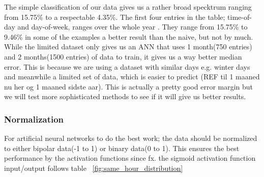 \begin{table}[!ht]
\centering  %
\caption{Results from the simple classification approach} %
\label{table:naiveTrainingApproach} %
\end{table}

The simple classification of our data gives us a rather broad specktrum ranging from 15.75\% to a respectable 4.35\%. The first four entries in the table; time-of-day and day-of-week, ranges over the whole year . They range from 15.75\% to 9.46\% in some of the examples a better result than the naive, but not by much. While the limited dataset only gives us an ANN that uses 1 month(750 entries) and 2 months(1500 entries) of data to train, it gives us a way better median error. This is because we are using a dataset with similar days e.g. winter days and meanwhile a limited set of data, which is easier to predict (REF til 1 maaned nu her og 1 maaned sidste aar). This is actually a pretty good error margin but we will test more sophisticated methods to see if it will give us better results. 
\subsubsection{Normalization}
For artificial neural networks to do the best work; the data should be normalized to either bipolar data(-1 to 1) or binary data(0 to 1). This ensures the best performance by the activation functions since fx. the sigmoid activation function input/output follows table ~\ref{fig:same_hour_distribution}

